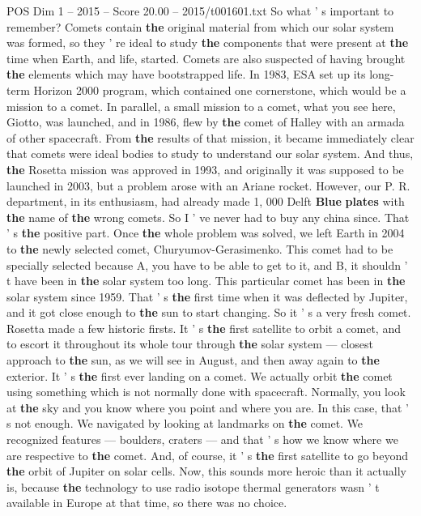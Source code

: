 \begin{textsample}{POS Dim 1 – 2015 – Score 20.00 – 2015/t001601.txt}
So what ' s important to remember?
Comets contain \textbf{the} original material from which our solar system was formed, so they ' re ideal to study \textbf{the} components that were present at \textbf{the} time when Earth, and life, started.
Comets are also suspected of having brought \textbf{the} elements which may have bootstrapped life.
In 1983, ESA set up its long-term Horizon 2000 program, which contained one cornerstone, which would be a mission to a comet.
In parallel, a small mission to a comet, what you see here, Giotto, was launched, and in 1986, flew by \textbf{the} comet of Halley with an armada of other spacecraft.
From \textbf{the} results of that mission, it became immediately clear that comets were ideal bodies to study to understand our solar system.
And thus, \textbf{the} Rosetta mission was approved in 1993, and originally it was supposed to be launched in 2003, but a problem arose with an Ariane rocket.
However, our P.
R. department, in its enthusiasm, had already made 1, 000 Delft \textbf{Blue} \textbf{plates} with \textbf{the} name of \textbf{the} wrong comets.
So I ' ve never had to buy any china since.
That ' s \textbf{the} positive part.
Once \textbf{the} whole problem was solved, we left Earth in 2004 to \textbf{the} newly selected comet, Churyumov-Gerasimenko.
This comet had to be specially selected because A, you have to be able to get to it, and B, it shouldn ' t have been in \textbf{the} solar system too long.
This particular comet has been in \textbf{the} solar system since 1959.
That ' s \textbf{the} first time when it was deflected by Jupiter, and it got close enough to \textbf{the} sun to start changing.
So it ' s a very fresh comet.
Rosetta made a few historic firsts.
It ' s \textbf{the} first satellite to orbit a comet, and to escort it throughout its whole tour through \textbf{the} solar system — closest approach to \textbf{the} sun, as we will see in August, and then away again to \textbf{the} exterior.
It ' s \textbf{the} first ever landing on a comet.
We actually orbit \textbf{the} comet using something which is not normally done with spacecraft.
Normally, you look at \textbf{the} sky and you know where you point and where you are.
In this case, that ' s not enough.
We navigated by looking at landmarks on \textbf{the} comet.
We recognized features — boulders, craters — and that ' s how we know where we are respective to \textbf{the} comet.
And, of course, it ' s \textbf{the} first satellite to go beyond \textbf{the} orbit of Jupiter on solar cells.
Now, this sounds more heroic than it actually is, because \textbf{the} technology to use radio isotope thermal generators wasn ' t available in Europe at that time, so there was no choice.

\end{textsample}
